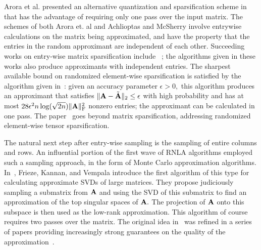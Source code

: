 Arora et al. presented an alternative quantization 
and sparsification scheme in~\cite{AHK06} that has the 
advantage of requiring only one pass over the input matrix. 
The schemes of both Arora et. al and Achlioptas and McSherry involve entrywise calculations on the 
matrix being approximated, and have the property that the entries 
in the random approximant are independent of each other.
Succeeding works on entry-wise matrix sparsification include%
~\cite{DNT10, DZ11, AKL13}; the algorithms given in these works also produce approximants 
with independent entries. The sharpest available bound on randomized element-wise
sparsification is satisfied by the algorithm given in~\cite{DZ11}: given an
accuracy parameter $\epsilon > 0,$ this algorithm produces an approximant that satisfies
$\|\mathbf{A} - \tilde{\mathbf{A}}\|_2 \leq \epsilon$ with high probability
and has at most $28 \epsilon^2 n \log(\sqrt{2n}) \|\mathbf{A}\|_{\mathrm{F}}^2$ nonzero entries;
the approximant can be calculated in one pass. The paper~\cite{DNT10} goes beyond matrix sparsification, addressing 
randomized element-wise tensor sparsification.


The natural next step after entry-wise sampling is the sampling of entire columns and rows.
An influential portion of the first wave of RNLA algorithms employed such a sampling approach,
in the form of Monte Carlo approximation algorithms.
In~\cite{FKV98}, Frieze, Kannan, and Vempala introduce the first algorithm of this type
for calculating approximate SVDs of large matrices. They propose 
judiciously sampling a submatrix from $\mathbf{A}$ and using the SVD of this 
submatrix to find an approximation of the top singular spaces of $\mathbf{A}.$ 
The projection of $\mathbf{A}$ onto this subspace is then used as the low-rank
approximation. This algorithm of course requires two passes over the matrix.
The original idea in~\cite{FKV98} was refined in
a series of papers providing increasingly strong guarantees on the quality of the 
approximation~\cite{DK01,DK03,FKV04,DKM06a,DKM06b}. 

